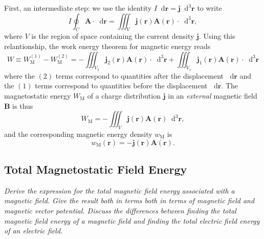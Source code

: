 \documentclass[11pt, a4paper]{article}
\newcommand{\diff}{\mathop{}\!\mathrm{d}} %
\newcommand{\dr}{\diff^{3} \r}  %
\renewcommand{\vec}[1]{\bm{#1}} %
\renewcommand{\r}{\vec{r}}
\newcommand{\B}{\vec{B}} %
\newcommand{\A}{\vec{A}} %
\renewcommand{\j}{\vec{j}}  %
\begin{document}
\begin{itemize}
    First, an intermediate step: we use the identity $ I \diff \r = \j \dr $ to write
	\begin{equation*}
		I \oint_{C} \A \cdot \diff \r = \iiint_{V} \j(\r)\A(\r) \cdot \dr,
	\end{equation*}
	where $ V $ is the region of space containing the current density $ \j $. Using this relantionship, the work energy theorem for magnetic energy reads
	\begin{equation*}
		W \equiv W_{\text{M}}^{(1)} - W_{\text{M}}^{(2)} = - \iiint_{V_{2}} \j_{2}(\r) \A(\r) \cdot \dr + \iiint_{V_{1}} \j_{1}(\r) \A(\r) \cdot \dr
	\end{equation*}
    where the $ (2) $ terms correspond to quantities after the displacement $ \diff \r $ and the $ (1) $ terms correspond to quantities before the displacement $ \diff \r $. The magnetostatic energy $ W_{\text{M}} $ of a charge distribution $ \j $ in an \textit{external} magnetic field $ \B $ is thus
	\begin{equation*}
		W_{\text{M}} = - \iiint_{V}\j(\r) \A(\r) \dr,
	\end{equation*}
	and the corresponding magnetic energy density $ w_{\text{M}} $ is
	\begin{equation*}
		w_{\text{M}}(\r) = - \j(\r) \A (\r).
	\end{equation*}
	
\end{itemize}
    
\subsection{Total Magnetostatic Field Energy} \label{ss:total-M-energy}
\textit{Derive the expression for the total magnetic field energy associated with a magnetic field. Give the result both in terms both in terms of magnetic field and magnetic vector potential. Discuss the differences between finding the total magnetic field energy of a magnetic field and finding the total electric field energy of an electric field.}
\end{document}
